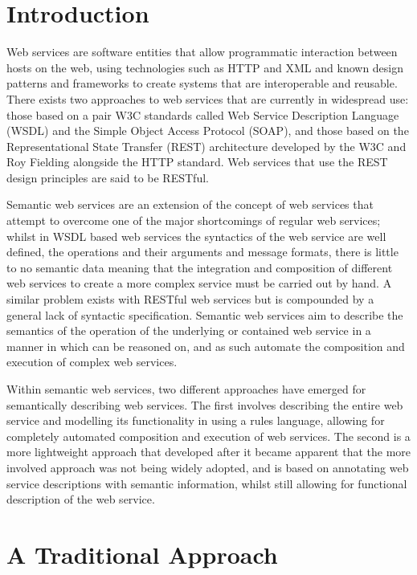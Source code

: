 \section{Introduction}

Web services are software entities that allow programmatic interaction between
hosts on the web, using technologies such as HTTP and XML and known design patterns and
frameworks to create systems that are interoperable and reusable. There
exists
two approaches to web services that are currently in widespread use: those based
on a pair W3C standards called Web Service Description Language (WSDL) and the
Simple Object Access Protocol (SOAP), and those based on the 
Representational State Transfer (REST) architecture developed by the W3C and Roy
Fielding alongside the HTTP standard. Web services that use the REST design
principles are said to be RESTful.

Semantic web services are an extension of the concept of web services that
attempt to overcome one of the major shortcomings of regular web services;
whilst in WSDL based web services the syntactics of the web service are well
defined, the operations and their arguments and message formats, there is
little to no semantic data meaning that the integration and
composition of different web services to create a more complex service must be
carried out by hand. A similar problem exists with RESTful web services but is
compounded by a general lack of syntactic specification. Semantic web services
aim to describe the semantics of the operation of the underlying or contained web
service in a manner in which can be reasoned on, and as such automate the
composition and execution of complex web services\cite{mcilraith_semantic_2001}.

Within semantic web services, two different approaches have emerged for
semantically describing web services. The first involves describing the entire
web service and modelling its functionality in using a rules language, allowing
for completely automated composition and execution of web services. The second
is a more lightweight approach that developed after it became apparent that the
more involved approach was not being widely adopted\cite{battle_report_????},
and is based on annotating web service descriptions with semantic information,
whilst still allowing for functional description of the web
service\cite{kopecky_sawsdl:_2007}.

\section{A Traditional Approach}

